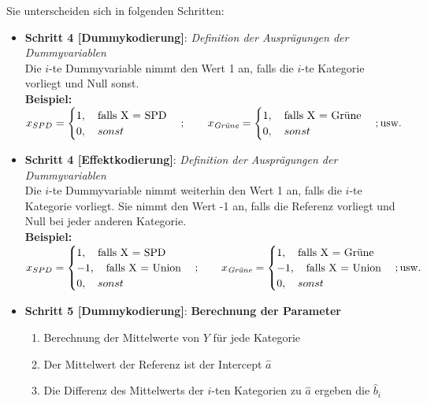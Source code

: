 \documentclass[a4paper]{article}
\begin{document}
\clearpage

\noindent Sie unterscheiden sich in folgenden Schritten:
\begin{itemize}
    \item[] \textbf{Schritt 4 [Dummykodierung]}: \textit{Definition der Ausprägungen der Dummyvariablen}\\
            Die $i$-te Dummyvariable nimmt den Wert 1 an, falls die $i$-te Kategorie vorliegt und Null sonst.\\
            \textbf{Beispiel:} $x_{SPD} = \begin{cases} 1,\quad \mbox{falls X = SPD}\\ 0,\quad sonst\end{cases};\qquad x_{\mbox{\it \scriptsize Grüne}} = \begin{cases} 1,\quad \mbox{falls X = Grüne}\\ 0,\quad sonst\end{cases}; \mbox{usw.}$
    \item[] \textbf{Schritt 4 [Effektkodierung]}: \textit{Definition der Ausprägungen der Dummyvariablen}\\
            Die $i$-te Dummyvariable nimmt weiterhin den Wert 1 an, falls die $i$-te Kategorie vorliegt. Sie nimmt den Wert -1 an, falls die Referenz vorliegt und Null bei jeder anderen Kategorie.\\
            \textbf{Beispiel:} $x_{SPD} = \begin{cases} 1,\quad \mbox{falls X = SPD}\\-1,\quad \mbox{falls X = Union}\\ 0,\quad sonst\end{cases};\qquad x_{\mbox{\it \scriptsize Grüne}} = \begin{cases} 1,\quad \mbox{falls X = Grüne}\\-1,\quad \mbox{falls X = Union}\\ 0,\quad sonst\end{cases}; \mbox{usw.}$
    \item[] \textbf{Schritt 5 [Dummykodierung]}: \textbf{Berechnung der Parameter}
            \begin{enumerate}
                \item Berechnung der Mittelwerte von $Y$ für jede Kategorie
                \item Der Mittelwert der Referenz ist der Intercept $\hat a$
                \item Die Differenz des Mittelwerts der $i$-ten Kategorien zu $\hat a$ ergeben die $\hat b_i$

\end{enumerate}
\end{itemize}
\end{document}
